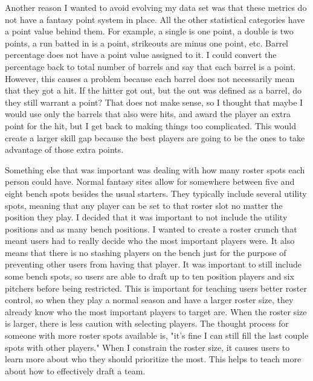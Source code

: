 \documentclass[10pt,twocolumn]{article}
\begin{document}
	 Another reason I wanted to avoid evolving my data set was that these metrics do not have a fantasy point system in place. All the other statistical categories have a point value behind them. For example, a single is one point, a double is two points, a run batted in is a point, strikeouts are minus one point, etc. Barrel percentage does not have a point value assigned to it. I could convert the percentage back to total number of barrels and say that each barrel is a point. However, this causes a problem because each barrel does not necessarily mean that they got a hit. If the hitter got out, but the out was defined as a barrel, do they still warrant a point? That does not make sense, so I thought that maybe I would use only the barrels that also were hits, and award the player an extra point for the hit, but I get back to making things too complicated. This would create a larger skill gap because the best players are going to be the ones to take advantage of those extra points. 
	 
	 Something else that was important was dealing with how many roster spots each person could have. Normal fantasy sites allow for somewhere between five and eight bench spots besides the usual starters. They typically include several utility spots, meaning that any player can be set to that roster slot no matter the position they play. I decided that it was important to not include the utility positions and as many bench positions. I wanted to create a roster crunch that meant users had to really decide who the most important players were. It also means that there is no stashing players on the bench just for the purpose of preventing other users from having that player. It was important to still include some bench spots, so users are able to draft up to ten position players and six pitchers before being restricted. This is important for teaching users better roster control, so when they play a normal season and have a larger roster size, they already know who the most important players to target are. When the roster size is larger, there is less caution with selecting players. The thought process for someone with more roster spots available is, "it's fine I can still fill the last couple spots with other players." When I constrain the roster size, it causes users to learn more about who they should prioritize the most. This helps to teach more about how to effectively draft a team.
	 	
\end{document}
